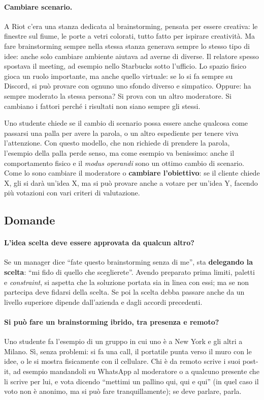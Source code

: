 \paragraph{Cambiare scenario.} A Riot c'era una stanza dedicata al brainstorming, pensata
per essere creativa: le finestre sul fiume, le porte a vetri colorati, tutto fatto per
ispirare creatività. Ma fare brainstorming sempre nella stessa stanza generava sempre lo
stesso tipo di idee: anche solo cambiare ambiente aiutava ad averne di diverse. Il
relatore spesso spostava il meeting, ad esempio nello Starbucks sotto l'ufficio. Lo
spazio fisico gioca un ruolo importante, ma anche quello virtuale: se lo si fa sempre su
Discord, si può provare con ognuno uno sfondo diverso e simpatico. Oppure: ha sempre
moderato la stessa persona? Si prova con un altro moderatore. Si cambiano i fattori
perché i risultati non siano sempre gli stessi.

Uno studente chiede se il cambio di scenario possa essere anche qualcosa come passarsi una
palla per avere la parola, o un altro espediente per tenere viva l'attenzione. Con questo
modello, che non richiede di prendere la parola, l'esempio della palla perde senso, ma come
esempio va benissimo: anche il comportamento fisico e il \emph{modus operandi} sono un ottimo
cambio di scenario. Come lo sono cambiare il moderatore o \textbf{cambiare l'obiettivo}: se
il cliente chiede X, gli si darà un'idea X, ma si può provare anche a votare per un'idea Y,
facendo più votazioni con vari criteri di valutazione.

\subsection{Domande}

\paragraph{L'idea scelta deve essere approvata da qualcun altro?} Se un manager dice ``fate
questo brainstorming senza di me'', sta \textbf{delegando la scelta}: ``mi fido di quello che
sceglierete''. Avendo preparato prima limiti, paletti e \emph{constraint}, si aspetta che la
soluzione portata sia in linea con essi; ma se non partecipa deve fidarsi della scelta. Se
poi la scelta debba passare anche da un livello superiore dipende dall'azienda e dagli
accordi precedenti.

\paragraph{Si può fare un brainstorming ibrido, tra presenza e remoto?} Uno studente fa
l'esempio di un gruppo in cui uno è a New York e gli altri a Milano. Sì, senza problemi: si
fa una call, il portatile punta verso il muro con le idee, o le si mostra fisicamente con
il cellulare. Chi è da remoto scrive i suoi post-it, ad esempio mandandoli su WhatsApp al
moderatore o a qualcuno presente che li scrive per lui, e vota dicendo ``mettimi un pallino
qui, qui e qui'' (in quel caso il voto non è anonimo, ma si può fare tranquillamente); se
deve parlare, parla.

